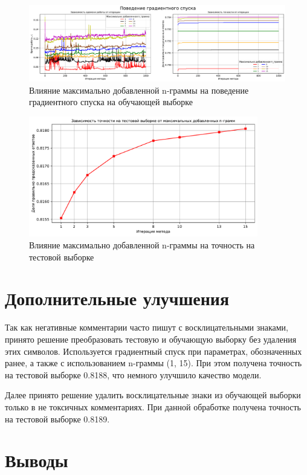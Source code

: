 \documentclass{article}
\begin{document}
\begin{figure}[H]
	\centering
	\includegraphics[width=15cm]{TASK2 n_gram.pdf}
	\caption{Влияние максимально добавленной n-граммы на поведение градиентного спуска на обучающей выборке}
	\label{fig:n_gram}
\end{figure}
\begin{figure}[H]
	\centering
	\includegraphics[width=10cm]{TASK2 n_gram test.pdf}
	\caption{Влияние максимально добавленной n-граммы на точность на тестовой выборке}
	\label{fig:n_gram_test}
\end{figure}

\section{Дополнительные улучшения}

Так как негативные комментарии часто пишут с восклицательными знаками, принято решение преобразовать тестовую и обучающую выборку без удаления этих символов. Используется градиентный спуск при параметрах, обозначенных ранее, а также с использованием n-граммы (1, 15). При этом получена точность на тестовой выборке 0.8188, что немного улучшило качество модели.

Далее принято решение удалить восклицательные знаки из обучающей выборки только в не токсичных комментариях. При данной обработке получена точность на тестовой выборке 0.8189.

\section{Выводы}
\end{document}
